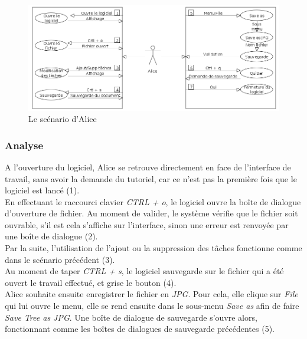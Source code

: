 \documentclass[12pt, a4paper]{article}
\begin{document}
\begin{figure}[h]
\begin{center}
   \includegraphics[scale = 0.52]{scenario-alice.png}
	\caption{Le scénario d'Alice}
	\end{center}
\end{figure}

\textcolor{NavyBlue}{\subsubsection{Analyse}}

A l'ouverture du logiciel, Alice se retrouve directement en face de l'interface de travail, sans avoir la demande du tutoriel, car ce n'est pas la première fois que le logiciel est lancé (1).\\


En effectuant le raccourci clavier \emph{CTRL + o}, le logiciel ouvre la boîte de dialogue d'ouverture de fichier. Au moment de valider, le système vérifie que le fichier soit ouvrable, s’il est cela s'affiche sur l'interface, sinon une erreur est renvoyée par une boîte de dialogue (2).\\


Par la suite, l'utilisation de l'ajout ou la suppression des tâches fonctionne comme dans le scénario précédent (3).\\


Au moment de taper \emph{CTRL + s}, le logiciel sauvegarde sur le fichier qui a été ouvert le travail effectué, et grise le bouton (4). \\


Alice souhaite ensuite enregistrer le fichier en \emph{JPG}. Pour cela, elle clique sur \emph{File} qui lui ouvre le menu, elle se rend ensuite dans le sous-menu \emph{Save as} afin de faire \emph{Save Tree as JPG}. Une boîte de dialogue de sauvegarde s'ouvre alors, fonctionnant comme les boîtes de dialogues de sauvegarde précédentes (5).\\
\end{document}
